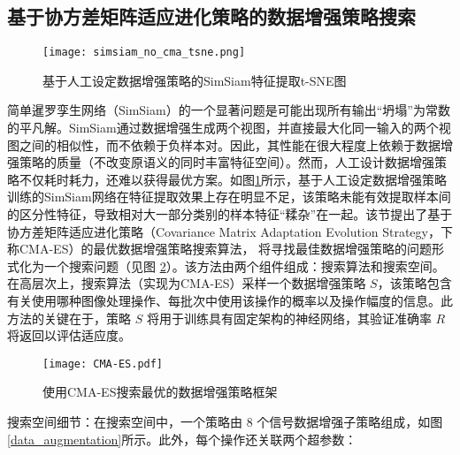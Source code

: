\documentclass[master]{thesis-uestc}
\begin{document}
\subsection{基于协方差矩阵适应进化策略的数据增强策略搜索}
\begin{figure}[h]
    \centering
    \texttt{[image: simsiam\_no\_cma\_tsne.png]}
    \caption{基于人工设定数据增强策略的SimSiam特征提取t-SNE图}
    \label{simsiam_no_cma_tsne}
\end{figure}
简单暹罗孪生网络（SimSiam）的一个显著问题是可能出现所有输出“坍塌”为常数的平凡解。SimSiam通过数据增强生成两个视图，并直接最大化同一输入的两个视图之间的相似性，而不依赖于负样本对。因此，其性能在很大程度上依赖于数据增强策略的质量（不改变原语义的同时丰富特征空间）。然而，人工设计数据增强策略不仅耗时耗力，还难以获得最优方案。如图\ref{simsiam_no_cma_tsne}所示，基于人工设定数据增强策略训练的SimSiam网络在特征提取效果上存在明显不足，该策略未能有效提取样本间的区分性特征，导致相对大一部分类别的样本特征“糅杂”在一起。该节提出了基于协方差矩阵适应进化策略（Covariance Matrix Adaptation Evolution Strategy，下称CMA-ES）的最优数据增强策略搜索算法，
将寻找最佳数据增强策略的问题形式化为一个搜索问题（见图 \ref{CMA-ES}）。该方法由两个组件组成：搜索算法和搜索空间。在高层次上，搜索算法（实现为CMA-ES）采样一个数据增强策略 \( S \)，该策略包含有关使用哪种图像处理操作、每批次中使用该操作的概率以及操作幅度的信息。此方法的关键在于，策略 \( S \) 将用于训练具有固定架构的神经网络，其验证准确率 \( R \) 将返回以评估适应度。
\begin{figure}[h]
    \centering
    \texttt{[image: CMA-ES.pdf]}
    \caption{使用CMA-ES搜索最优的数据增强策略框架}
    \label{CMA-ES}
\end{figure}
搜索空间细节：在搜索空间中，一个策略由 8 个信号数据增强子策略组成，如图\ref{data_augmentation}所示。此外，每个操作还关联两个超参数：
\end{document}

